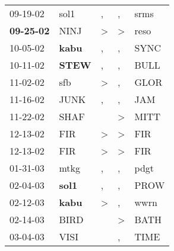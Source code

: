 \begin{supertabular}{p{0.07\textwidth}p{0.06\textwidth}p{0.02\textwidth}p{0.02\textwidth}p{0.06\textwidth}}
          09-19-02\textsuperscript{} &           sol1\textsuperscript{} &                , &                , &           srms\textsuperscript{} \\
 \textbf{09-25-02\textsuperscript{}} &           NINJ\textsuperscript{} &     \textgreater &     \textgreater &           reso\textsuperscript{} \\
          10-05-02\textsuperscript{} &  \textbf{kabu\textsuperscript{}} &                , &                , &           SYNC\textsuperscript{} \\
          10-11-02\textsuperscript{} &  \textbf{STEW\textsuperscript{}} &                , &                , &           BULL\textsuperscript{} \\
          11-02-02\textsuperscript{} &            sfb\textsuperscript{} &     \textgreater &                , &           GLOR\textsuperscript{} \\
          11-16-02\textsuperscript{} &           JUNK\textsuperscript{} &                , &                , &            JAM\textsuperscript{} \\
          11-22-02\textsuperscript{} &           SHAF\textsuperscript{} &                  &     \textgreater &           MITT\textsuperscript{} \\
          12-13-02\textsuperscript{} &            FIR\textsuperscript{} &     \textgreater &     \textgreater &            FIR\textsuperscript{} \\
          12-13-02\textsuperscript{} &            FIR\textsuperscript{} &     \textgreater &     \textgreater &            FIR\textsuperscript{} \\
          01-31-03\textsuperscript{} &           mtkg\textsuperscript{} &                , &                , &           pdgt\textsuperscript{} \\
          02-04-03\textsuperscript{} &  \textbf{sol1\textsuperscript{}} &                , &                , &           PROW\textsuperscript{} \\
          02-12-03\textsuperscript{} &  \textbf{kabu\textsuperscript{}} &     \textgreater &                , &           wwrn\textsuperscript{} \\
          02-14-03\textsuperscript{} &           BIRD\textsuperscript{} &                  &     \textgreater &           BATH\textsuperscript{} \\
          03-04-03\textsuperscript{} &           VISI\textsuperscript{} &                  &                , &           TIME\textsuperscript{} \\

\end{supertabular}

